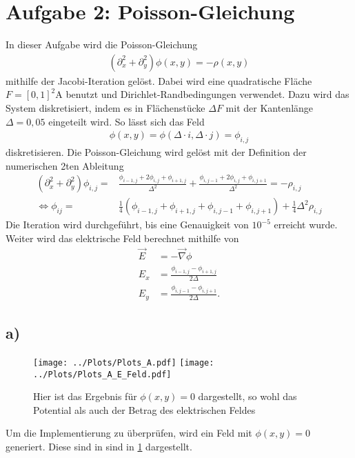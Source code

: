 
\section*{Aufgabe 2: Poisson-Gleichung}
In dieser Aufgabe wird die Poisson-Gleichung
\begin{align}
	\left( \partial_x^2+\partial_y^2 \right)\phi(x,y)=-\rho(x,y)
\end{align}
mithilfe der Jacobi-Iteration gelöst.
Dabei wird eine quadratische Fläche $F=[0,1]^2$A benutzt und Dirichlet-Randbedingungen verwendet.
Dazu wird das System diskretisiert, indem es in Flächenstücke $\Delta F$ mit der Kantenlänge $\Delta = 0,05$ eingeteilt wird.
So lässt sich das Feld 
\begin{align}
\phi(x ,y)=\phi(\Delta\cdot i , \Delta \cdot j)=\phi_{i,j}
\end{align}
diskretisieren.
Die Poisson-Gleichung wird gelöst mit der Definition der numerischen 2ten Ableitung
\begin{align}
	(\partial_x^2+\partial_y^2)\phi_{i,j}=&\frac{\phi_{i-1,j}+2\phi_{i,j}+\phi_{i+1,j}}{\Delta^2}+\frac{\phi_{i,j-1}+2\phi_{i,j}+\phi_{i,j+1}}{\Delta^2}=-\rho_{i,j}\\
	\Leftrightarrow\phi_{ij}=&\frac{1}{4}\left(\phi_{i-1,j}+\phi_{i+1,j}+\phi_{i,j-1}+\phi_{i,j+1}\right)+\frac{1}{4}\Delta^2 \rho_{i,j}
\end{align}
Die Iteration wird durchgeführt, bis eine Genauigkeit von $10^{-5}$ erreicht wurde.
Weiter wird das elektrische Feld berechnet mithilfe von
\begin{align}
	\vec{E} &= -\vec{\nabla} \phi\\
	E_x&=\frac{\phi_{i-1,j}-\phi_{i+1,j}}{2\Delta}\\
	E_y&=\frac{\phi_{i,j-1}-\phi_{i,j+1}}{2\Delta}.
\end{align}
\newpage
\subsection*{a)}
\begin{figure}[h!]
	\centering
	\texttt{[image: ../Plots/Plots\_A.pdf]}
	\texttt{[image: ../Plots/Plots\_A\_E\_Feld.pdf]}
	\caption{Hier ist das Ergebnis für $\phi(x,y)=0$ dargestellt, so wohl das Potential als auch der Betrag des elektrischen Feldes}\label{fig:Ergebis_a}
\end{figure}
Um die Implementierung zu überprüfen, wird ein Feld mit $\phi(x,y)= 0$ generiert.
Diese sind in  sind in \cref{fig:Ergebis_a} dargestellt.
\newpage
